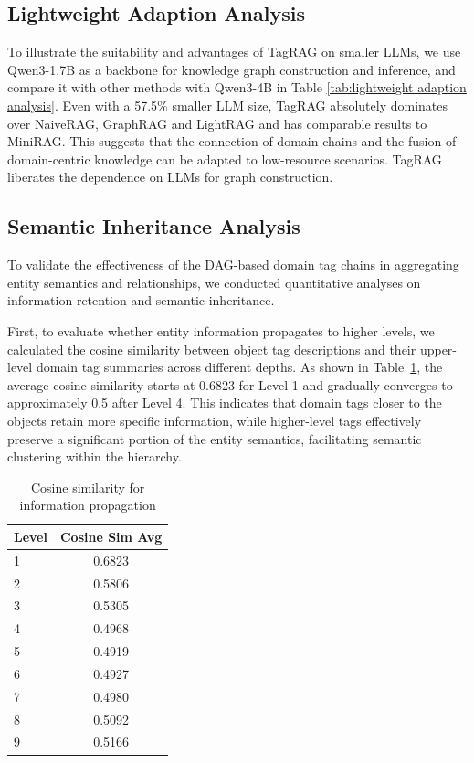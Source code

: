 \documentclass[11pt]{article}
\begin{document}
\subsection{Lightweight Adaption Analysis}
To illustrate the suitability and advantages of TagRAG on smaller LLMs, we use Qwen3-1.7B as a backbone for knowledge graph construction and inference, and compare it with other methods with Qwen3-4B in Table \ref{tab:lightweight adaption analysis}.
Even with a 57.5\% smaller LLM size, TagRAG absolutely dominates over NaiveRAG, GraphRAG and LightRAG and has comparable results to MiniRAG.
This suggests that the connection of domain chains and the fusion of domain-centric knowledge can be adapted to low-resource scenarios. TagRAG liberates the dependence on LLMs for graph construction.




\subsection{Semantic Inheritance Analysis}
To validate the effectiveness of the DAG-based domain tag chains in aggregating entity semantics and relationships, we conducted quantitative analyses on information retention and semantic inheritance.

First, to evaluate whether entity information propagates to higher levels, we calculated the cosine similarity between object tag descriptions and their upper-level domain tag summaries across different depths. As shown in Table~\ref{tab:info_propagation}, the average cosine similarity starts at 0.6823 for Level 1 and gradually converges to approximately 0.5 after Level 4. This indicates that domain tags closer to the objects retain more specific information, while higher-level tags effectively preserve a significant portion of the entity semantics, facilitating semantic clustering within the hierarchy.

\begin{table}[h]
\centering
\begin{tabular}{lc}
\toprule
Level & Cosine Sim Avg \\
\midrule
1 & 0.6823 \\
2 & 0.5806 \\
3 & 0.5305 \\
4 & 0.4968 \\
5 & 0.4919 \\
6 & 0.4927 \\
7 & 0.4980 \\
8 & 0.5092 \\
9 & 0.5166 \\
\bottomrule
\end{tabular}
\caption{Cosine similarity for information propagation}
\label{tab:info_propagation}
\end{table}
\end{document}
